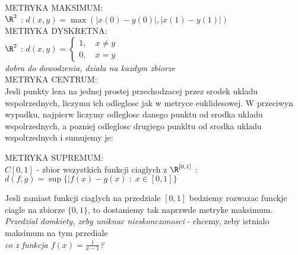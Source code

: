 \documentclass{article}
\begin{document}
    \color{def}METRYKA MAKSIMUM:\color{txt}\medskip\\
        $\R^2$ : $d(x,y)=\max(|x(0)-y(0)|,|x(1)-y(1)|)$\bigskip\\
    \color{def}METRYKA DYSKRETNA:\color{txt}\medskip\\
        $\R^2$ : $d(x,y)=\begin{cases}1, \quad x\neq y\\0, \quad x=y\end{cases}$\smallskip\\
        \indent\emph{\color{acc}dobra do dowodzenia, dziala na kazdym zbiorze}
        \bigskip\\

    \color{def}METRYKA CENTRUM:\color{txt}\medskip\\
        Jesli punkty leza na jednej prostej przechodzacej przez srodek ukladu wspolrzednych, liczymu ich odleglosc jak w metryce euklidesowej. W przeciwyn wypadku, najpierw liczymy odleglosc danego punktu od srodka ukladu wspolrzednych, a pozniej odleglosc drugiego punkltu od srodka ukladu wspolrzednych i sumujemy je:\\
        \begin{center}\end{center}\bigskip

    \color{def}METRYKA SUPREMUM:\color{txt}\medskip\\
        $C[0,1]$ - zbior wszystkich funkcji ciaglych z $\R^{[0,1]}$ : $d(f,g)=\sup\{|f(x)-g(x)\;:\;x\in[0,1]\}$\\
        \begin{center}\end{center}\medskip
    Jesli zamiast funkcji ciaglych na przedziale $[0,1]$ bedziemy rozwazac funckje ciagle na zbiorze $\{0,1\}$, to dostaniemy tak naprzwde metryke maksimum.\medskip\\
    \emph{Przedzial domkiety, zeby uniknac nieskonczonosci} - chcemy, zeby istnialo maksimum na tym przediale\\
    \emph{\color{acc}co z funkcja $f(x)=\frac1{x-1}$?}\bigskip\\
\end{document}
